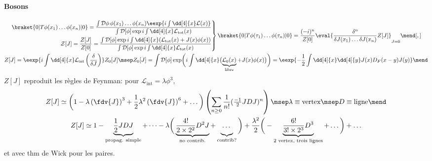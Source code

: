 \documentclass{article}
\begin{document}
\paragraph{Bosons}
\begin{gather*}
\left.
\begin{aligned}
\braket{0|T\phi(x_1)\dots\phi(x_n)|0} = \frac{\int\mathcal{D}\phi\, \phi(x_1)\dots\phi(x_n) \eexp{i\int\dd[4]{x}\mathcal{L}(x)}}{\int\mathcal{D}[\phi]\exp{i\int\dd[4]{x}\mathcal{L}_\text{tot}(x)}}\\
\mathcal{Z}[J]
= \frac{Z[J]}{Z[0]}
= \frac{\int\mathcal{D}[\phi]\exp{i\int\dd[4]{x}(\mathcal{L}_\text{tot}(x)+J(x)\phi(x))}}{\int\mathcal{D}[\phi]\exp{i\int\dd[4]{x}\mathcal{L}_\text{tot}(x)}}
\end{aligned}
\right\rbrace
\braket{0|T\phi(\tau_1)\dots\phi(\tau_n)|0}
=
\frac{(-i)^n}{Z[0]} \eval{\frac{\delta^n}{\delta J(x_1)\dots\delta J(x_n)} Z[J]}_{J=0}
\mend[,]\\
Z[J]
= \eexp{i\int \dd[4]{x} \mathcal{L}_\text{int}\left(\frac{\delta}{\delta J}\right)}Z_0[J]
\msep
Z_0[J]
= \int\mathcal{D}[\phi]\exp \biggl( i\int\dd[4]{x} \bigl( \underbrace{\mathcal{L}_0(x)}_\text{libre}+J(x)\phi(x) \bigr) \biggr)
= \eexp{-\frac{1}{2}\int\dd[4]{x}\dd[4]{y}J(x)D_F(x-y)J(y)}
\mend
\end{gather*}
$Z[J]$ reproduit les règles de Feynman:
pour $\mathcal{L}_\text{int} = \lambda \phi^3$,
\begin{gather*}
Z[J] \simeq \left( 1 -\lambda \left( \fdv{J} \right)^3 + \frac{1}{2} \lambda^2 \left( \fdv{J} \right)^6 + \dots \right)
\left( \sum_{n\geq0} \frac{1}{n!} (\tfrac{-1}{2}JDJ)^n \right)
\msep
\lambda \equiv \text{vertex}
\msep
D \equiv \text{ligne}
\mend\\
Z[J] \simeq 
1 - \underbrace{\frac{1}{2} JDJ\vphantom{\frac{1}{2^2}}}_\text{propag. simple} + \dots
- \lambda \bigg( \underbrace{ \frac{4!}{2\times2^2}D^2J}_\text{no contrib.} + \underbrace{\dots \vphantom{\frac{1}{2^2}}}_\text{contrib?} \bigg)
+ \frac{\lambda^2}{2} \bigg(-\underbrace{\frac{6!}{3!\times2^3}D^3}_\text{2 vertex, trois lignes} + \dots \bigg)
+\dots
\end{gather*}
et avec thm de Wick pour les paires.
\end{document}
